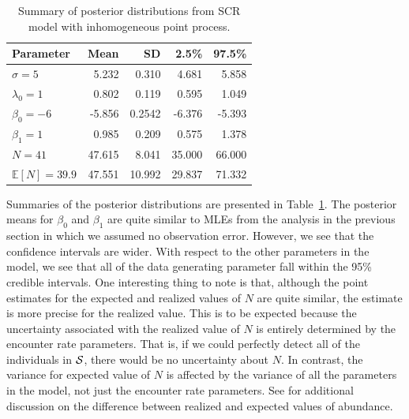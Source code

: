 \begin{table}%
\centering
\caption{Summary of posterior distributions from SCR model with
  inhomogeneous point process. }
\begin{tabular}{lrrrr}
\hline
Parameter 	 	& Mean  	& SD    	& 2.5\% 	& 97.5\% \\
\hline
 $\sigma=5$ 	 	&  5.232 	&  0.310 	&  4.681 	&  5.858 \\
 $\lambda_0=1$ 	 	&  0.802 	&  0.119 	&  0.595 	&  1.049 \\
 $\beta_0=-6$ 	 	& -5.856        & 0.2542        & -6.376        & -5.393 \\
 $\beta_1=1$ 	 	&  0.985 	&  0.209 	&  0.575 	&  1.378 \\
 $N=41$ 	 	& 47.615 	&  8.041 	& 35.000 	& 66.000 \\
 $\mathbb{E}[N]=39.9$ 	& 47.551 	& 10.992 	& 29.837 	& 71.332 \\
\hline
\end{tabular}
\label{state-space.tab.simIPP}
\end{table}

Summaries of the posterior distributions are presented in
Table~\ref{state-space.tab.simIPP}. The posterior means for $\beta_0$
and $\beta_1$ are quite similar to MLEs from the analysis in the
previous section in which we assumed no observation error. However, we
see that the confidence intervals are wider. With respect to the other
parameters in the model, we see that all of the data
generating parameter fall within the 95\% credible intervals. One
interesting thing to note is that, although the point estimates for
the expected and realized values of $N$ are quite similar, the
estimate is more precise for the realized value. This is to be
expected because the uncertainty associated with the realized value of
$N$ is entirely determined by the encounter rate parameters. That is,
if we could perfectly detect all of the individuals in $\cal S$, there
would be no uncertainty about $N$. In contrast, the variance for
expected value of $N$ is affected by the variance of all the parameters
in the model, not just the encounter rate parameters. See
\citet{efford_fewster:2012} for additional discussion on the
difference between realized and expected values of abundance.


